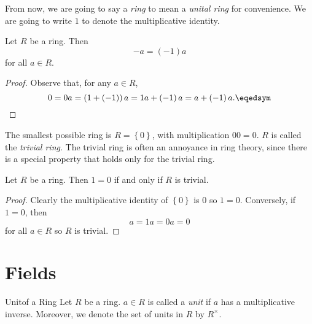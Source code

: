 \documentclass[pmath347]{subfiles}
\begin{document}
    \np From now, we are going to say a \textit{ring} to mean a \textit{unital ring} for convenience. We are going to write $1$ to denote the multiplicative identity.

    \begin{prop}{}
        Let $R$ be a ring. Then
        \begin{equation*}
            -a = \left( -1 \right) a
        \end{equation*}
        for all $a\in R$.
    \end{prop}

    \begin{proof}
        Observe that, for any $a\in R$,
        \begin{equation*}
            0 = 0a = \left( 1+\left( -1 \right)  \right) a = 1a + \left( -1 \right) a = a+\left( -1 \right) a. \eqedsym
        \end{equation*}
    \end{proof}

    \np The smallest possible ring is $R=\left\lbrace 0 \right\rbrace$, with multiplication $00=0$. $R$ is called the \emph{trivial ring}. The trivial ring is often an annoyance in ring theory, since there is a special property that holds only for the trivial ring.

    \begin{prop}{}
        Let $R$ be a ring. Then $1=0$ if and only if $R$ is trivial.
    \end{prop}

    \begin{proof}
        Clearly the multiplicative identity of $\left\lbrace 0 \right\rbrace$ is $0$ so $1=0$. Conversely, if $1=0$, then
        \begin{equation*}
            a = 1a = 0a = 0
        \end{equation*}
        for all $a\in R$ so $R$ is trivial.
    \end{proof}
    
    \section{Fields}
    
    \begin{definition}{Unit}{of a Ring}
        Let $R$ be a ring. $a\in R$ is called a \emph{unit} if $a$ has a multiplicative inverse. Moreover, we denote the set of units in $R$ by $R^\times$.
    \end{definition}
\end{document}
